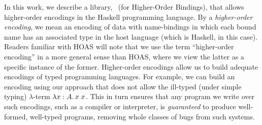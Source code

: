 \documentclass[natbib]{sigplanconf}
\begin{document}
In this work, we describe a library, \ourlib\ (for Higher-Order
Bindings), that allows higher-order encodings in the Haskell
programming language. By a \emph{higher-order encoding}, we mean an
encoding of data with name-bindings in which each bound name has an
associated type in the host language (which is Haskell, in this case).
Readers familiar with HOAS will note that we use the term
``higher-order encoding'' in a more general sense than HOAS, where we
view the latter as a specific instance of the former. Higher-order
encodings allow us to build adequate encodings of typed programming
languages. For example, we can build an encoding using our approach
that does not allow the ill-typed (under simple typing) $\lambda$-term
$\lambda x:A.\, x\;x$. This in turn ensures that any program we write
over such encodings, such as a compiler or interpreter, is
\emph{guaranteed} to produce well-formed, well-typed programs,
removing whole classes of bugs from such systems.


\end{document}
